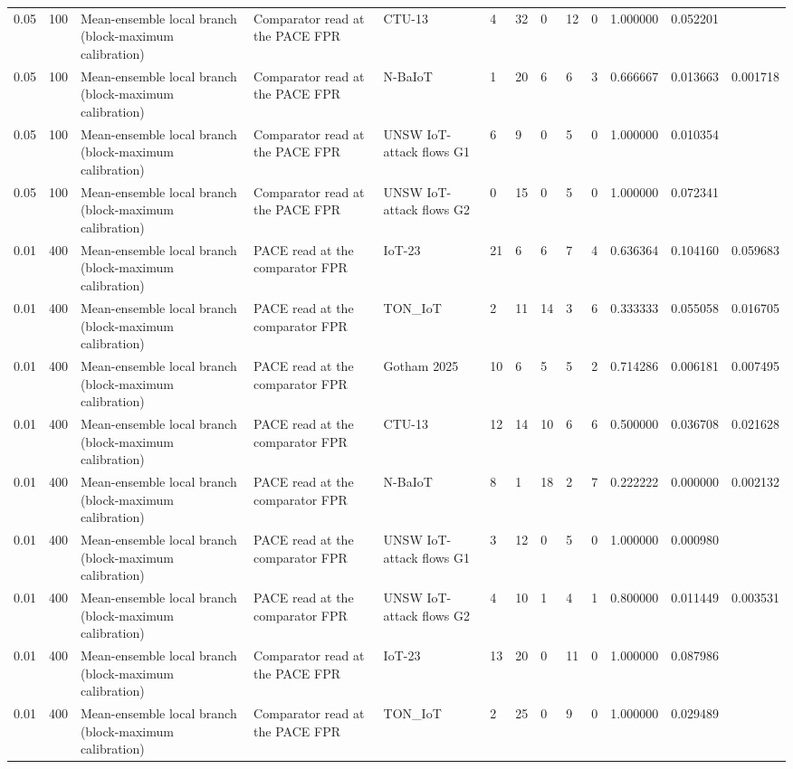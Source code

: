 \begin{tabular}{lllllllllllll}
0.05 & 100 & Mean-ensemble local branch (block-maximum calibration) & Comparator read at the PACE FPR & CTU-13 & 4 & 32 & 0 & 12 & 0 & 1.000000 & 0.052201 &  \\
0.05 & 100 & Mean-ensemble local branch (block-maximum calibration) & Comparator read at the PACE FPR & N-BaIoT & 1 & 20 & 6 & 6 & 3 & 0.666667 & 0.013663 & 0.001718 \\
0.05 & 100 & Mean-ensemble local branch (block-maximum calibration) & Comparator read at the PACE FPR & UNSW IoT-attack flows G1 & 6 & 9 & 0 & 5 & 0 & 1.000000 & 0.010354 &  \\
0.05 & 100 & Mean-ensemble local branch (block-maximum calibration) & Comparator read at the PACE FPR & UNSW IoT-attack flows G2 & 0 & 15 & 0 & 5 & 0 & 1.000000 & 0.072341 &  \\
0.01 & 400 & Mean-ensemble local branch (block-maximum calibration) & PACE read at the comparator FPR & IoT-23 & 21 & 6 & 6 & 7 & 4 & 0.636364 & 0.104160 & 0.059683 \\
0.01 & 400 & Mean-ensemble local branch (block-maximum calibration) & PACE read at the comparator FPR & TON\_IoT & 2 & 11 & 14 & 3 & 6 & 0.333333 & 0.055058 & 0.016705 \\
0.01 & 400 & Mean-ensemble local branch (block-maximum calibration) & PACE read at the comparator FPR & Gotham 2025 & 10 & 6 & 5 & 5 & 2 & 0.714286 & 0.006181 & 0.007495 \\
0.01 & 400 & Mean-ensemble local branch (block-maximum calibration) & PACE read at the comparator FPR & CTU-13 & 12 & 14 & 10 & 6 & 6 & 0.500000 & 0.036708 & 0.021628 \\
0.01 & 400 & Mean-ensemble local branch (block-maximum calibration) & PACE read at the comparator FPR & N-BaIoT & 8 & 1 & 18 & 2 & 7 & 0.222222 & 0.000000 & 0.002132 \\
0.01 & 400 & Mean-ensemble local branch (block-maximum calibration) & PACE read at the comparator FPR & UNSW IoT-attack flows G1 & 3 & 12 & 0 & 5 & 0 & 1.000000 & 0.000980 &  \\
0.01 & 400 & Mean-ensemble local branch (block-maximum calibration) & PACE read at the comparator FPR & UNSW IoT-attack flows G2 & 4 & 10 & 1 & 4 & 1 & 0.800000 & 0.011449 & 0.003531 \\
0.01 & 400 & Mean-ensemble local branch (block-maximum calibration) & Comparator read at the PACE FPR & IoT-23 & 13 & 20 & 0 & 11 & 0 & 1.000000 & 0.087986 &  \\
0.01 & 400 & Mean-ensemble local branch (block-maximum calibration) & Comparator read at the PACE FPR & TON\_IoT & 2 & 25 & 0 & 9 & 0 & 1.000000 & 0.029489 &  \\

\end{tabular}
